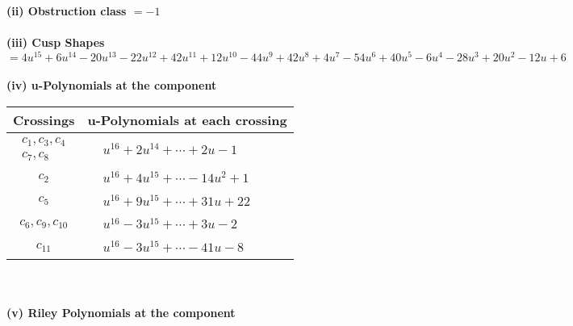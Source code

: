 \documentclass[1p]{elsarticle_modified}
\theoremstyle{definition}
\begin{document}
\flushleft \textbf{(ii) Obstruction class $= -1$}\\~\\
\flushleft \textbf{(iii) Cusp Shapes $= 4 u^{15}+6 u^{14}-20 u^{13}-22 u^{12}+42 u^{11}+12 u^{10}-44 u^9+42 u^8+4 u^7-54 u^6+40 u^5-6 u^4-28 u^3+20 u^2-12 u+6$}\\~\\
\newpage\renewcommand{\arraystretch}{1}
\flushleft \textbf{(iv) u-Polynomials at the component}\newline \\
\begin{tabular}{m{50pt}|m{274pt}}
Crossings & \hspace{64pt}u-Polynomials at each crossing \\
\hline $$\begin{aligned}c_{1},c_{3},c_{4}\\c_{7},c_{8}\end{aligned}$$&$\begin{aligned}
&u^{16}+2 u^{14}+\cdots+2 u-1
\end{aligned}$\\
\hline $$\begin{aligned}c_{2}\end{aligned}$$&$\begin{aligned}
&u^{16}+4 u^{15}+\cdots-14 u^2+1
\end{aligned}$\\
\hline $$\begin{aligned}c_{5}\end{aligned}$$&$\begin{aligned}
&u^{16}+9 u^{15}+\cdots+31 u+22
\end{aligned}$\\
\hline $$\begin{aligned}c_{6},c_{9},c_{10}\end{aligned}$$&$\begin{aligned}
&u^{16}-3 u^{15}+\cdots+3 u-2
\end{aligned}$\\
\hline $$\begin{aligned}c_{11}\end{aligned}$$&$\begin{aligned}
&u^{16}-3 u^{15}+\cdots-41 u-8
\end{aligned}$\\
\hline
\end{tabular}\\~\\
\newpage\renewcommand{\arraystretch}{1}
\flushleft \textbf{(v) Riley Polynomials at the component}\newline \\
\end{document}
